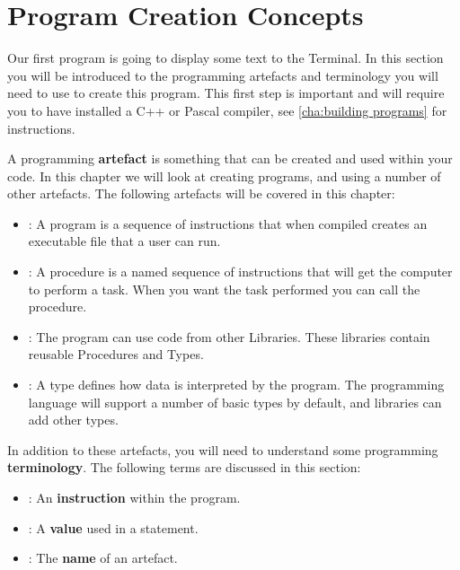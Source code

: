 \clearpage
\section{Program Creation Concepts} %
\label{sec:program_creation_concepts}

Our first program is going to display some text to the Terminal. In this section you will be introduced to the programming artefacts and terminology you will need to use to create this program. This first step is important and will require you to have installed a C++ or Pascal compiler, see \cref{cha:building programs}  for instructions.

A programming \textbf{artefact} is something that can be created and used within your code. In this chapter we will look at creating programs, and using a number of other artefacts. The following artefacts will be covered in this chapter:
\begin{itemize}
  \item {}: A program is a sequence of instructions that when compiled creates an executable file that a user can run.
  \item {}: A procedure is a named sequence of instructions that will get the computer to perform a task. When you want the task performed you can call the procedure.
  \item {}: The program can use code from other Libraries. These libraries contain reusable Procedures and Types. 
  \item {}: A type defines how data is interpreted by the program. The programming language will support a number of basic types by default, and libraries can add other types. 
\end{itemize}

In addition to these artefacts, you will need to understand some programming \textbf{terminology}. The following terms are discussed in this section:
\begin{itemize}
  \item {}: An \textbf{instruction} within the program.
  \item {}: A \textbf{value} used in a statement.
  \item {}: The \textbf{name} of an artefact.
\end{itemize}

